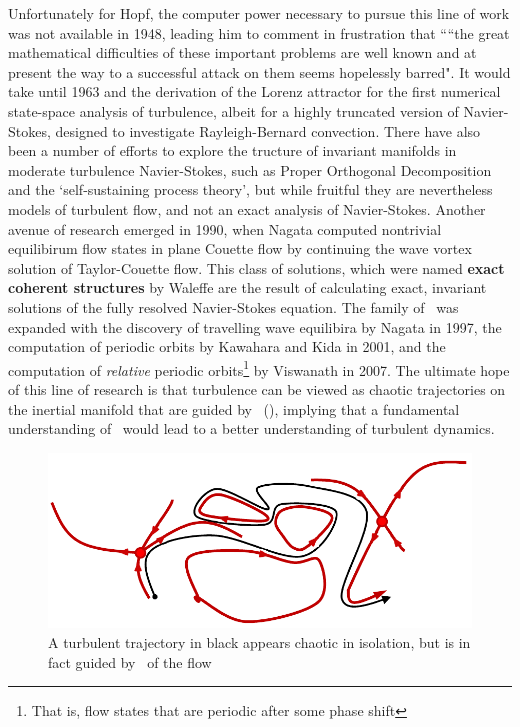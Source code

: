 Unfortunately for Hopf, the computer power necessary to pursue this line of work was not available in 1948, leading him to comment in frustration that ``“the great mathematical difficulties of these important problems are well
known and at present the way to a successful attack on them seems hopelessly
barred". It would take until 1963 and the derivation of the Lorenz attractor for the first numerical state-space analysis of turbulence, albeit for a highly truncated version of Navier-Stokes, designed to investigate Rayleigh-Bernard convection. There have also been a number of efforts to explore the tructure of invariant manifolds in moderate turbulence Navier-Stokes, such as Proper Orthogonal Decomposition and the `self-sustaining process theory', but while fruitful they are nevertheless models of turbulent flow, and not an exact analysis of Navier-Stokes. Another avenue of research emerged in 1990, when Nagata computed nontrivial equilibirum flow states in plane Couette flow by continuing the wave vortex solution of Taylor-Couette flow. This class of solutions, which were named {\bf exact coherent structures} by Waleffe are the result of calculating exact, invariant solutions of the fully resolved Navier-Stokes equation. The family of \ecs~was expanded with the discovery of travelling wave equilibira by Nagata in 1997, the computation of periodic orbits by Kawahara and Kida in 2001, and the computation of \emph{relative} periodic orbits\footnote{That is, flow states that are periodic after some phase shift} by Viswanath in 2007. The ultimate hope of this line of research is that turbulence can be viewed as chaotic trajectories on the inertial manifold that are guided by \ecs~(), implying that a fundamental understanding of \ecs~would lead to a better understanding of turbulent dynamics. \\
\begin{figure}
\centerline{
\includegraphics[scale=0.8]{Figs/phaseSpaceTraj}}
\caption{A turbulent trajectory in black appears chaotic in isolation, but is in fact guided by \ecs~of the flow}\label{fig:guidedTurbulence}
\end{figure}

